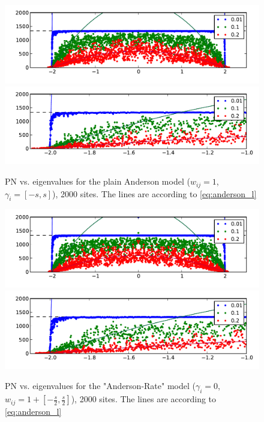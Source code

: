 \documentclass[onecolumn,fleqn,longbibliography]{revtex4}
\begin{document}
\begin{figure}[H]
\includegraphics{pta_anderson_b1}\\
\includegraphics{pta_anderson_b1_zoom}
\caption{PN vs. eigenvalues for the plain Anderson model ($w_{ij}=1$, $\gamma_i = [-s,s]$), 2000 sites. 
The lines are according to \autoref{eq:anderson_l}
}\label{fig:anderson}
\end{figure}

\begin{figure}[H]
\includegraphics{pta_anderson_rates_b1}\\
\includegraphics{pta_anderson_rates_b1_zoom}
\caption{PN vs. eigenvalues for the "Anderson-Rate" model ($\gamma_i = 0$, $w_{ij} = 1 + \left[-\frac{s}{2}, \frac{s}{2}\right]$), 2000 sites. 
The lines are according to \autoref{eq:anderson_l}
}\label{fig:anderson_rate}
\end{figure}
\end{document}
